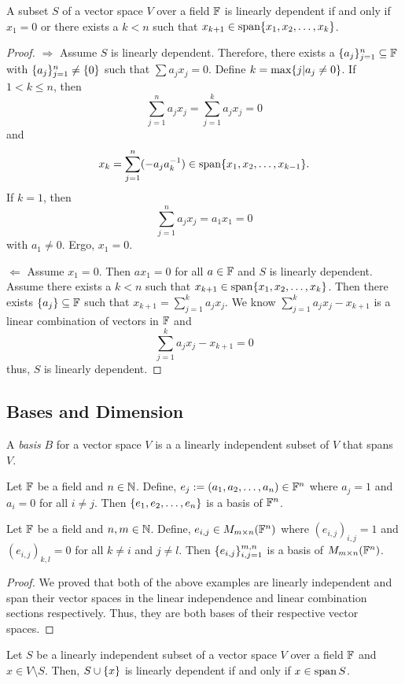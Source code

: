 \begin{thm}
	A subset $S$ of a vector space $V$ over a field $\mathbb{F}$ is linearly dependent if and only if $x_1=0$ or there exists a $k<n$ such that $x_{k+1}\in\operatorname{span} \lbrace x_1,x_2,\ldots,x_k \rbrace$.
\end{thm}
\begin{proof}
	$\Rightarrow$ Assume $S$ is linearly dependent.
	Therefore, there exists a $\lbrace a_j \rbrace_{j=1}^n\subseteq\mathbb{F}$ with $\lbrace a_j \rbrace_{j=1}^n\neq\lbrace 0 \rbrace$ such that $\sum a_jx_j=0$.
	Define $k=\max\lbrace j|a_j\neq 0 \rbrace$.
	If $1<k\leq n$, then
	\[
		\sum_{j=1}^n a_jx_j=\sum_{j=1}^k a_jx_j=0
	\]
	and
	\[
		x_k = \sum_{j=1}^n(-a_ja_k^{-1})\in\operatorname{span}\lbrace x_1,x_2,\ldots,x_{k-1} \rbrace.
	\]
	If $k=1$, then
	\[
		\sum_{j=1}^n a_jx_j=a_1x_1=0
	\]
	with $a_1\neq 0$.
	Ergo, $x_1=0$.

	$\Leftarrow$ Assume $x_1=0$.
	Then $ax_1=0$ for all $a\in\mathbb{F}$ and $S$ is linearly dependent.
	Assume there exists a $k<n$ such that $x_{k+1}\in\operatorname{span} \lbrace x_1,x_2,\ldots, x_k \rbrace$.
	Then there exists $\lbrace a_j \rbrace\subseteq\mathbb{F}$ such that $x_{k+1}=\sum_{j=1}^k a_jx_j$.
	We know $\sum_{j=1}^k a_jx_j - x_{k+1}$ is a linear combination of vectors in $\mathbb{F}$ and
	\[
		\sum_{j=1}^k a_jx_j - x_{k+1}=0
	\]
	thus, $S$ is linearly dependent.
\end{proof}

\pagebreak

\subsection{Bases and Dimension}

\begin{definition}
	A \textit{basis} $B$ for a vector space $V$ is a a linearly independent subset of $V$ that spans $V$.
\end{definition}

\begin{example}
	Let $\mathbb{F}$ be a field and $n\in\mathbb{N}$.
	Define, $e_j:=(a_1,a_2,\ldots,a_n)\in\mathbb{F}^n$ where $a_j=1$ and $a_i=0$ for all $i\neq j$.
	Then $\lbrace e_1,e_2,\ldots,e_n \rbrace$ is a basis of $\mathbb{F}^n$.
\end{example}

\begin{example}
	Let $\mathbb{F}$ be a field and $n,m\in\mathbb{N}$.
	Define, $e_{i,j}\in M_{m\times n}(\mathbb{F}^n)$ where $(e_{i,j})_{i,j}=1$ and $(e_{i,j})_{k,l}=0$ for all $k\neq i$ and $j\neq l$.
	Then $\lbrace e_{i,j} \rbrace_{i,j=1}^{m,n}$ is a basis of $M_{m\times n}(\mathbb{F}^n)$.
\end{example}
\begin{proof}
	We proved that both of the above examples are linearly independent and span their vector spaces in the linear independence and linear combination sections respectively.
	Thus, they are both bases of their respective vector spaces.
\end{proof}

\begin{thm}
	Let $S$ be a linearly independent subset of a vector space $V$ over a field $\mathbb{F}$ and $x\in V\setminus S$.
	Then, $S\cup\lbrace x \rbrace$ is linearly dependent if and only if $x\in\operatorname{span} S$.
\end{thm}
